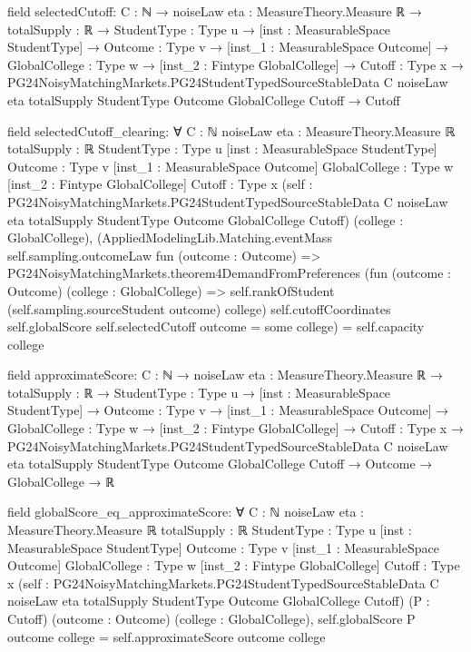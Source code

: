 \documentclass[10pt]{article}
\begin{document}
\begin{ReviewVerbatim}
field selectedCutoff:
{C : ℕ} →
  {noiseLaw eta : MeasureTheory.Measure ℝ} →
    {totalSupply : ℝ} →
      {StudentType : Type u} →
        [inst : MeasurableSpace StudentType] →
          {Outcome : Type v} →
            [inst_1 : MeasurableSpace Outcome] →
              {GlobalCollege : Type w} →
                [inst_2 : Fintype GlobalCollege] →
                  {Cutoff : Type x} →
                    PG24NoisyMatchingMarkets.PG24StudentTypedSourceStableData C noiseLaw eta totalSupply StudentType
                        Outcome GlobalCollege Cutoff →
                      Cutoff

field selectedCutoff_clearing:
∀ {C : ℕ} {noiseLaw eta : MeasureTheory.Measure ℝ} {totalSupply : ℝ} {StudentType : Type u}
  [inst : MeasurableSpace StudentType] {Outcome : Type v} [inst_1 : MeasurableSpace Outcome] {GlobalCollege : Type w}
  [inst_2 : Fintype GlobalCollege] {Cutoff : Type x}
  (self :
    PG24NoisyMatchingMarkets.PG24StudentTypedSourceStableData C noiseLaw eta totalSupply StudentType Outcome
      GlobalCollege Cutoff)
  (college : GlobalCollege),
  (AppliedModelingLib.Matching.eventMass self.sampling.outcomeLaw fun (outcome : Outcome) =>
      PG24NoisyMatchingMarkets.theorem4DemandFromPreferences
          (fun (outcome : Outcome) (college : GlobalCollege) =>
            self.rankOfStudent (self.sampling.sourceStudent outcome) college)
          self.cutoffCoordinates self.globalScore self.selectedCutoff outcome =
        some college) =
    self.capacity college

field approximateScore:
{C : ℕ} →
  {noiseLaw eta : MeasureTheory.Measure ℝ} →
    {totalSupply : ℝ} →
      {StudentType : Type u} →
        [inst : MeasurableSpace StudentType] →
          {Outcome : Type v} →
            [inst_1 : MeasurableSpace Outcome] →
              {GlobalCollege : Type w} →
                [inst_2 : Fintype GlobalCollege] →
                  {Cutoff : Type x} →
                    PG24NoisyMatchingMarkets.PG24StudentTypedSourceStableData C noiseLaw eta totalSupply StudentType
                        Outcome GlobalCollege Cutoff →
                      Outcome → GlobalCollege → ℝ

field globalScore_eq_approximateScore:
∀ {C : ℕ} {noiseLaw eta : MeasureTheory.Measure ℝ} {totalSupply : ℝ} {StudentType : Type u}
  [inst : MeasurableSpace StudentType] {Outcome : Type v} [inst_1 : MeasurableSpace Outcome] {GlobalCollege : Type w}
  [inst_2 : Fintype GlobalCollege] {Cutoff : Type x}
  (self :
    PG24NoisyMatchingMarkets.PG24StudentTypedSourceStableData C noiseLaw eta totalSupply StudentType Outcome
      GlobalCollege Cutoff)
  (P : Cutoff) (outcome : Outcome) (college : GlobalCollege),
  self.globalScore P outcome college = self.approximateScore outcome college


\end{ReviewVerbatim}
\end{document}

